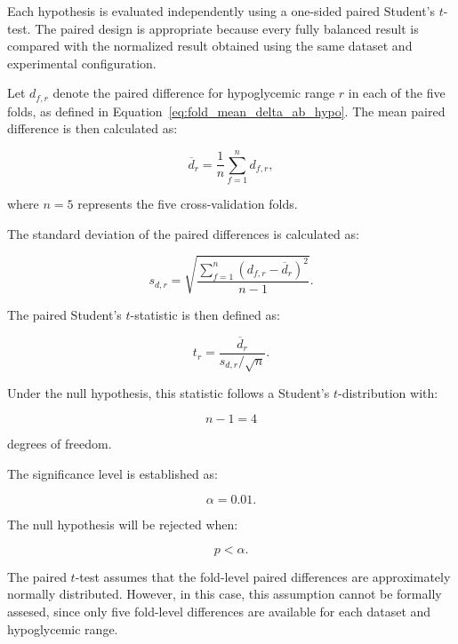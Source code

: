 Each hypothesis is evaluated independently using a one-sided paired Student's \(t\)-test. The paired design is appropriate because every fully balanced result is compared with the normalized result obtained using the same dataset and experimental configuration.

Let $d_{f,r}$ denote the paired difference for hypoglycemic range $r$ in each of the five folds, as defined in Equation~\ref{eq:fold_mean_delta_ab_hypo}. The mean paired difference is then calculated as:

\begin{equation}
\overline{d}_r
=
\frac{1}{n}
\sum_{f=1}^{n} d_{f,r},
\label{eq:mean_paired_difference}
\end{equation}

where \(n=5\) represents the five cross-validation folds.

The standard deviation of the paired differences is calculated as:

\begin{equation}
s_{d,r}
=
\sqrt{
\frac{
\sum_{f=1}^{n}
\left(
d_{f,r}-\overline{d}_r
\right)^2
}{
n-1
}
}.
\label{eq:paired_difference_sd}
\end{equation}

The paired Student's \(t\)-statistic is then defined as:

\begin{equation}
t_r
=
\frac{
\overline{d}_r
}{
s_{d,r}/\sqrt{n}
}.
\label{eq:paired_t_statistic}
\end{equation}

Under the null hypothesis, this statistic follows a Student's \(t\)-distribution with:

\begin{equation}
n-1=4
\end{equation}

degrees of freedom.

The significance level is established as:

\begin{equation}
\alpha=0.01.
\end{equation}

The null hypothesis will be rejected when:

\begin{equation}
p<\alpha.
\end{equation}

The paired \(t\)-test assumes that the fold-level paired differences are approximately normally distributed. However, in this case, this assumption cannot be formally assesed, since only five fold-level differences are available for each dataset and hypoglycemic range.

